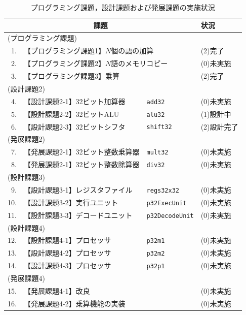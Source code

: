 \documentclass{jarticle}[11pt]
\begin{document}
\begin{table}[tb]
\caption{プログラミング課題，設計課題および発展課題の実施状況}
\label{tab:プログラミング課題，設計課題および発展課題の実施状況}
\begin{center}
{\small
\begin{tabular}{rll|l}
\hline
\hline
\multicolumn{3}{c|}{課題} & 状況 \\
\hline
\multicolumn{3}{l|}{(プログラミング課題)} & \\
1. & \multicolumn{2}{l|}{【プログラミング課題1】$N$個の語の加算 } & (2)完了 \\
2. & \multicolumn{2}{l|}{【プログラミング課題2】$N$語のメモリコピー} & (0)未実施 \\
3. & \multicolumn{2}{l|}{【プログラミング課題3】乗算} & (2)完了 \\
\multicolumn{3}{l|}{(設計課題2)} & \\
4. & 【設計課題2-1】32ビット加算器   & \verb|add32|          & (0)未実施 \\
5. & 【設計課題2-2】32ビットALU      & \verb|alu32|          & (1)設計中 \\
6. & 【設計課題2-3】32ビットシフタ   & \verb|shift32|        & (2)設計完了 \\
\multicolumn{3}{l|}{(発展課題2)} & \\
7. & 【発展課題2-1】32ビット整数乗算器 & \verb|mult32|       & (0)未実施 \\
8. & 【発展課題2-1】32ビット整数除算器 & \verb|div32|        & (0)未実施 \\
\multicolumn{3}{l|}{(設計課題3)} & \\
9. & 【設計課題3-1】レジスタファイル & \verb|regs32x32|      & (0)未実施 \\
10. & 【設計課題3-2】実行ユニット     & \verb|p32ExecUnit|    & (0)未実施 \\
11. & 【設計課題3-3】デコードユニット & \verb|p32DecodeUnit|  & (0)未実施 \\
\multicolumn{3}{l|}{(設計課題4)} & \\
12. & 【設計課題4-1】プロセッサ      & \verb|p32m1|          & (0)未実施 \\
13. & 【設計課題4-2】プロセッサ      & \verb|p32m2|          & (0)未実施 \\
14. & 【設計課題4-3】プロセッサ      & \verb|p32p1|          & (0)未実施 \\
\multicolumn{3}{l|}{(発展課題4)} & \\
15. & 【発展課題4-1】改良            &                       & (0)未実施 \\
16. & 【発展課題4-2】乗算機能の実装  &                       & (0)未実施 \\
\hline
\end{tabular}
}
\end{center}
\end{table}
\end{document}
